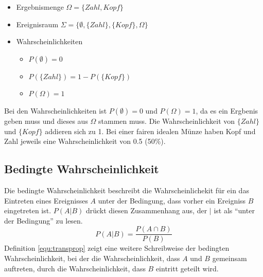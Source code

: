 \begin{itemize}
\item Ergebnismenge $\Omega = \{Zahl, Kopf\}$
\item Ereignisraum $\Sigma = \{\emptyset, \{Zahl\}, \{Kopf\}, \Omega\}$
\item Wahrscheinlichkeiten
	\begin{itemize}
	\item $P(\emptyset) = 0$
	\item $P(\{Zahl\}) = 1 - P(\{Kopf\})$
	\item $P(\Omega) = 1$
	\end{itemize}
\end{itemize}
Bei den Wahrscheinlichkeiten ist $P(\emptyset) = 0$ und $P(\Omega) = 1$, da es ein Ergbenis geben muss und dieses aus $\Omega$ stammen muss. Die Wahrscheinlichkeit von $\{Zahl\}$ und $\{Kopf\}$ addieren sich zu 1. Bei einer fairen idealen Münze haben Kopf und Zahl jeweils eine Wahrscheinlichkeit von 0.5 (50\%).


\subsection{Bedingte Wahrscheinlichkeit}
\label{sec:condprop}
Die bedingte Wahrscheinlichkeit beschreibt die Wahrscheinlichekit für ein das Eintreten eines Ereignisses $A$ unter der Bedingung, dass vorher ein Ereigniss $B$ eingetreten ist. $P(A | B)$ drückt diesen Zusammenhang aus, der $|$ ist als ``unter der Bedingung'' zu lesen.
\begin{equation}
\label{equ:transprop}
P(A | B) = \frac{P(A \cap B)}{P(B)}
\end{equation}
Definition \ref{equ:transprop} zeigt eine weitere Schreibweise der bedingten Wahrscheinlichkeit, bei der die Wahrscheinlichkeit, dass $A$ und $B$ gemeinsam auftreten, durch die Wahrscheinlichkeit, dass $B$ eintritt geteilt wird.






